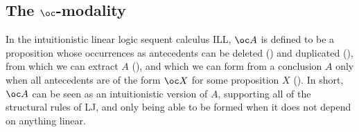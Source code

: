 %
%
%
%
%
%
%

\subsection{The $\oc$-modality}


In the intuitionistic linear logic sequent calculus ILL, $\oc A$ is defined
to be a proposition whose occurrences as antecedents can be deleted
() and duplicated (), from which we can
extract $A$ (), and which we can form from a conclusion
$A$ only when all antecedents are of the form $\oc X$ for some proposition $X$
().
In short, $\oc A$ can be seen as an intuitionistic version of $A$, supporting
all of the structural rules of LJ, and only being able to be formed when it
does not depend on anything linear.

